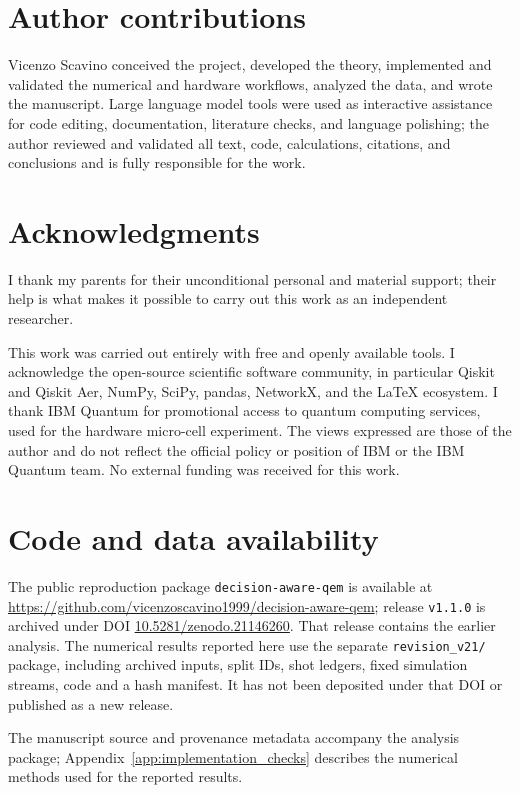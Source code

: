 \documentclass[a4paper,onecolumn,unpublished,nopdfoutputerror]{quantumarticle}
\theoremstyle{plain}
\theoremstyle{definition}
\newcommand{\1}{\mathbf{1}}
\begin{document}
\section*{Author contributions}

Vicenzo Scavino conceived the project, developed the theory, implemented and validated the numerical and hardware workflows, analyzed the data, and wrote the manuscript.  Large language model tools were used as interactive assistance for code editing, documentation, literature checks, and language polishing; the author reviewed and validated all text, code, calculations, citations, and conclusions and is fully responsible for the work.

\section*{Acknowledgments}

I thank my parents for their unconditional personal and material support; their help is what makes it possible to carry out this work as an independent researcher.

This work was carried out entirely with free and openly available tools.  I acknowledge the open-source scientific software community, in particular Qiskit and Qiskit Aer, NumPy, SciPy, pandas, NetworkX, and the LaTeX ecosystem.  I thank IBM Quantum for promotional access to quantum computing services, used for the hardware micro-cell experiment.  The views expressed are those of the author and do not reflect the official policy or position of IBM or the IBM Quantum team.  No external funding was received for this work.

\section*{Code and data availability}

The public reproduction package \texttt{decision-aware-qem} is available at \url{https://github.com/vicenzoscavino1999/decision-aware-qem}; release \texttt{v1.1.0} is archived under DOI \href{https://doi.org/10.5281/zenodo.21146260}{10.5281/zenodo.21146260}. That release contains the earlier analysis. The numerical results reported here use the separate \texttt{revision\_v21/} package, including archived inputs, split IDs, shot ledgers, fixed simulation streams, code and a hash manifest. It has not been deposited under that DOI or published as a new release.

The manuscript source and provenance metadata accompany the analysis package; Appendix~\ref{app:implementation_checks} describes the numerical methods used for the reported results.
\end{document}

